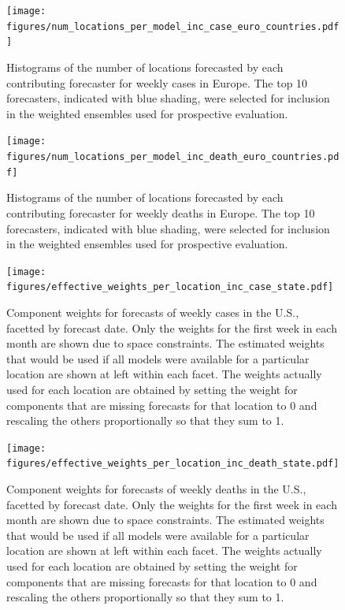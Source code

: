 \documentclass{article}
\begin{document}
\begin{figure}
  \texttt{[image: figures/num\_locations\_per\_model\_inc\_case\_euro\_countries.pdf]}
  \caption{Histograms of the number of locations forecasted by each contributing forecaster for weekly cases in Europe. The top 10 forecasters, indicated with blue shading, were selected for inclusion in the weighted ensembles used for prospective evaluation.}
  \label{fig:case_eu_num_locations}
\end{figure}

\begin{figure}
  \texttt{[image: figures/num\_locations\_per\_model\_inc\_death\_euro\_countries.pdf]}
  \caption{Histograms of the number of locations forecasted by each contributing forecaster for weekly deaths in Europe. The top 10 forecasters, indicated with blue shading, were selected for inclusion in the weighted ensembles used for prospective evaluation.}
  \label{fig:death_eu_num_locations}
\end{figure}

\begin{figure}
  \texttt{[image: figures/effective\_weights\_per\_location\_inc\_case\_state.pdf]}
  \caption{Component weights for forecasts of weekly cases in the U.S., facetted by forecast date. Only the weights for the first week in each month are shown due to space constraints. The estimated weights that would be used if all models were available for a particular location are shown at left within each facet. The weights actually used for each location are obtained by setting the weight for components that are missing forecasts for that location to 0 and rescaling the others proportionally so that they sum to 1.}
  \label{fig:case_us_effective_weights}
\end{figure}

\begin{figure}
  \texttt{[image: figures/effective\_weights\_per\_location\_inc\_death\_state.pdf]}
  \caption{Component weights for forecasts of weekly deaths in the U.S., facetted by forecast date. Only the weights for the first week in each month are shown due to space constraints. The estimated weights that would be used if all models were available for a particular location are shown at left within each facet. The weights actually used for each location are obtained by setting the weight for components that are missing forecasts for that location to 0 and rescaling the others proportionally so that they sum to 1.}
  \label{fig:death_us_effective_weights}
\end{figure}
\end{document}
